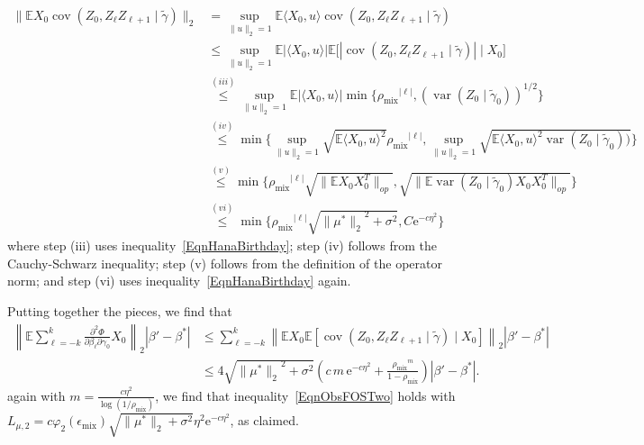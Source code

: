 \documentclass[twoside,11pt]{article}
\renewcommand{\red}[1]{\textcolor{red}{#1}}
\newcommand{\mjwcomment}[1]{{\bf{{\red{{MJW --- #1}}}}}}
\DeclareMathOperator{\var}{var}
\DeclareMathOperator{\cov}{cov}
\def\EE{ \mathbb{E} }
\def\E{ \mathrm{e} }							%
\newcommand{\norm}[1]{\ensuremath{\|#1\|_2}}
\newcommand{\mixcoef}{\ensuremath{\rho_{\mathrm{mix}}}}
\newcommand{\mixcoefeps}{\ensuremath{\epsilon_{\mathrm{mix}}}}
\newcommand{\paramobs}{\mu}
\newcommand{\trueparamobs}{\ensuremath{\paramobs^*}}
\newcommand{\paramtrans}{\beta}
\newcommand{\paramtranstwo}{\paramtrans'}
\newcommand{\trueparamtrans}{\paramtrans^*}
\newcommand{\paramgamma}{\gamma}
\newcommand{\paramgammatilde}{\widetilde{\paramgamma}}
\newcommand{\condcov}[3]{\cov(#1, #2 \mid #3)}
\newcommand{\SNR}{\eta^2}
\newcommand{\factormixing}{\varphi_2(\mixcoefeps)}
\newcommand{\plaincon}{\ensuremath{c}}
\begin{document}
\begin{align*}
\| \EE X_0 \condcov{Z_0}{Z_{\ell}Z_{\ell+1}}{\paramgammatilde} \|_2 &=
\sup_{\|u\|_2=1} \EE \langle X_0,u\rangle
\condcov{Z_0}{Z_{\ell}Z_{\ell+1}}{\paramgammatilde}\\
%
& \leq \sup_{\norm{u}=1} \EE |\langle X_0,u\rangle| \EE
\big[|\condcov{Z_0}{Z_{\ell}Z_{\ell+1}}{\paramgammatilde}| \mid
  X_0\big] \\ 
%
& \stackrel{(iii)}{\leq} \sup_{\norm{u}=1} \EE |\langle X_0,u\rangle|
\min\{\mixcoef^{|\ell|}, (\var(Z_0 \mid \paramgammatilde_0))^{1/2} \}
\\
%
& \stackrel{(iv)}{\leq} \min\{ \sup_{\norm{u}=1} \sqrt{ \EE \langle
  X_0,u\rangle^2} \mixcoef^{|\ell|}, \sup_{\norm{u}=1}\sqrt{\EE
  \langle X_0,u\rangle^2 \var(Z_0\mid \paramgammatilde_0))} \} \\
%
& \stackrel{(v)}{\leq} \min\{ \mixcoef^{|\ell|} \sqrt{ \| \EE
  X_0X_0^T\|_{op}}, \sqrt{\|\EE \var(Z_0 \mid \paramgammatilde_0)
  X_0X_0^T\|_{op}}\}\\ 
%
& \stackrel{(vi)}{\leq} \min\{ \mixcoef^{|\ell|} \sqrt{
  \norm{\trueparamobs}^2+\sigma^2 }, C \E^{-c\SNR}\}
\end{align*}
where step (iii) uses inequality~\eqref{EqnHanaBirthday}; step (iv)
follows from the Cauchy-Schwarz inequality; step (v) follows from the
definition of the operator norm; and step (vi) uses
inequality~\eqref{EqnHanaBirthday} again.

Putting together the pieces, we find that
\begin{align*}
\left\| \EE \sum_{\ell =-k}^k \frac{\partial^2 \Phi}{\partial
  \paramtrans_\ell \partial \paramgamma_0} X_0 \right\|_2
|\paramtranstwo - \trueparamtrans| & \leq \sum_{\ell=-k}^k \left\| \EE
X_0 \EE [\condcov{Z_0}{Z_{\ell} Z_{\ell+1}}{\paramgammatilde}\mid X_0]
\right\|_2 |\paramtranstwo-\trueparamtrans|\\
%
& \leq 4 \sqrt{\norm{\trueparamobs}^2 + \sigma^2} \left(\plaincon \, m
\, \E^{-c\SNR}+ \frac{\mixcoef^m}{1-\mixcoef}\right) |\paramtrans' -
\trueparamtrans|.
\end{align*}
again with $m = \frac{c \SNR }{\log (1/\mixcoef)}$, we find that
inequality~\eqref{EqnObsFOSTwo} holds with \\
$L_{\paramobs,2} =
\plaincon \factormixing \sqrt{\norm{\trueparamobs}+\sigma^2} \SNR
\E^{-c\SNR}$, as claimed.


\end{document}

